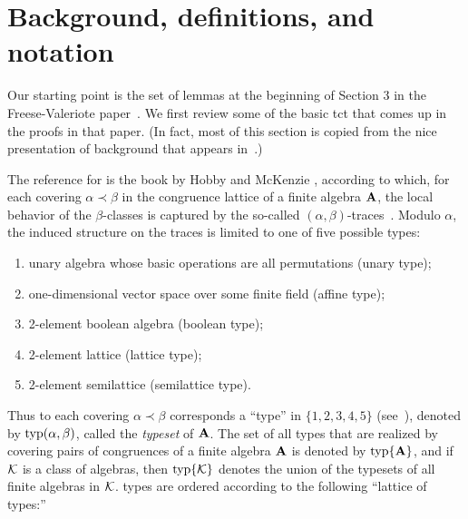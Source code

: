 
\section{Background, definitions, and notation}
\label{sec:defin-notat}
Our starting point is the set of lemmas at the beginning of Section 3 in
the Freese-Valeriote paper~\cite{Freese:2009}.
We first review some of the basic \ac{tct}
that comes up in the proofs in that paper. (In fact, most of this section 
is copied from the nice presentation of \tct background that appears
in~\cite[Sec.~2]{Freese:2009}.)

The reference for \tct is the book by Hobby and McKenzie
\cite{HM:1988}, according to which,
for each covering $\alpha \prec \beta$ in the congruence lattice of a finite
algebra $\mathbf{A}$, the local behavior of the $\beta$-classes is captured by the
so-called $(\alpha, \beta)$-traces~\cite[Def.~2.15]{HM:1988}.
Modulo $\alpha$, the induced structure on the traces is limited to one
of five possible types:

\begin{enumerate}[(1)]
\item unary algebra whose basic operations are all permutations (unary type);
\item one-dimensional vector space over some finite field (affine type);
\item 2-element boolean algebra (boolean type);
\item 2-element lattice (lattice type);
\item 2-element semilattice (semilattice type).
\end{enumerate}

Thus to each covering $\alpha \prec \beta$
corresponds a ``\tct type'' in $\{1,2,3,4,5\}$ 
(see~\cite[Def.~5.1]{HM:1988}),
denoted by $\operatorname{typ}(\alpha, \beta)$, called the \emph{typeset} of $\mathbf{A}$.
The set of all \tct types that are realized by covering pairs of congruences of a
finite algebra $\mathbf{A}$ is denoted by $\operatorname{typ}\{\mathbf{A}\}$, and if $\mathcal{K}$ is a class of algebras,
then $\operatorname{typ}\{\mathcal{K}\}$ denotes the union of the typesets of all finite algebras in $\mathcal{K}$.
\tct types are ordered according to the following ``lattice of types:''

